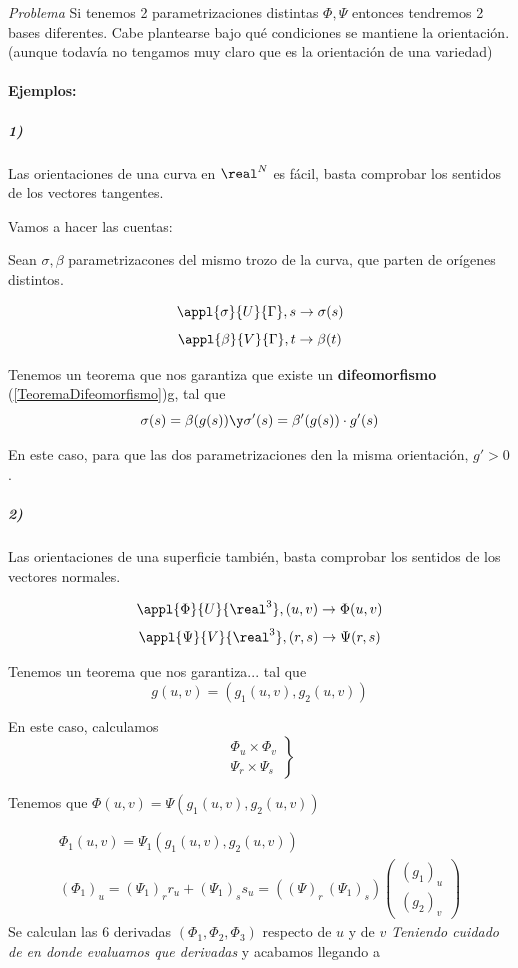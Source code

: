 \textit{Problema} Si tenemos 2 parametrizaciones distintas $\Phi,\Psi$ entonces tendremos 2 bases diferentes. Cabe plantearse bajo qué condiciones se mantiene la orientación. (aunque todavía no tengamos muy claro que es la orientación de una variedad)

\paragraph{Ejemplos:}
\subparagraph{1)} Las orientaciones de una curva en $\real^N$ es fácil, basta comprobar los sentidos de los vectores tangentes. 

Vamos a hacer las cuentas:

Sean $\sigma,\beta$ parametrizacones del mismo trozo de la curva, que parten de orígenes distintos.

\[\appl{\sigma}{U}{\Gamma},s\to \sigma(s)\]
\[\appl{\beta}{V}{\Gamma},t\to \beta(t)\]

Tenemos un teorema que nos garantiza que existe un \textbf{difeomorfismo} (\ref{TeoremaDifeomorfismo})g, tal que \[\sigma(s) = \beta(g(s)) \y \sigma'(s) = \beta'(g(s))\cdot g'(s)\]

En este caso, para que las dos parametrizaciones den la misma orientación, $g'>0$.

\subparagraph{2)} Las orientaciones de una superficie también, basta comprobar los sentidos de los vectores normales.

\[\appl{\Phi}{U}{\real^3}, (u,v) \to \Phi(u,v)\]
\[\appl{\Psi}{V}{\real^3}, (r,s) \to \Psi(r,s)\]

Tenemos un teorema que nos garantiza... tal que \[g(u,v) = (g_1(u,v),g_2(u,v))\]

En este caso, calculamos \[\left.\begin{array}{c}
\Phi_u\times\Phi_v \\
\Psi_r\times\Psi_s
\end{array}\right\}\]

Tenemos que $\Phi(u,v) = \Psi(g_1(u,v),g_2(u,v))$

\begin{gather*}
\Phi_1(u,v) = \Psi_1(g_1(u,v),g_2(u,v))\\
(\Phi_1)_{u} = (\Psi_1)_r r_u + (\Psi_1)_s s_u = ((\Psi)_r\,(\Psi_1)_s)\begin{pmatrix}
(g_1)_u\\(g_2)_v
\end{pmatrix}
\end{gather*}
Se calculan las 6 derivadas $(\Phi_1,\Phi_2,\Phi_3)$ respecto de $u$ y de $v$ \emph{Teniendo cuidado de en donde evaluamos que derivadas} y acabamos llegando a

